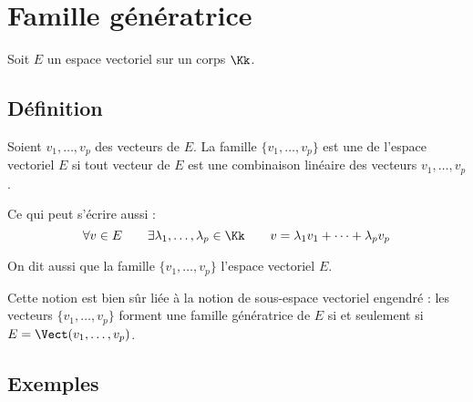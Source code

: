 \documentclass[class=report,crop=false]{standalone}
\begin{document}
\section{Famille génératrice}

Soit $E$ un espace vectoriel sur un corps $\Kk$.

\subsection{Définition}

\begin{definition}
Soient $v_1,\dots ,v_p$ des vecteurs de $E$.
La famille $\{v_1,\dots ,v_p\}$ est une  de l'espace vectoriel $E$
si tout vecteur de $E$ est une combinaison linéaire des vecteurs $v_1,\dots ,v_p$.

Ce qui peut s'écrire aussi :
$$\forall v \in E  \qquad \exists \lambda_1, \ldots,\lambda_p \in \Kk \qquad
v=\lambda_1 v_1+\cdots + \lambda_p v_p$$
\end{definition}

On dit aussi que la famille $\{v_1,\dots ,v_p\}$  l'espace vectoriel $E$.

Cette notion est bien sûr liée à la notion de sous-espace vectoriel engendré :
les vecteurs $\{v_1,\dots ,v_p\}$ forment une famille génératrice de $E$
si et seulement si $E=\Vect (v_1,\ldots,v_p)$.

\subsection{Exemples}
\end{document}
